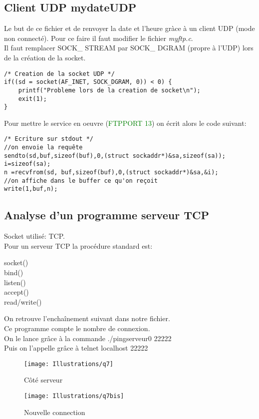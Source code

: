 \documentclass[paper=a4, fontsize=12pt]{article}
\numberwithin{equation}{section}		%
\numberwithin{figure}{section}			%
\numberwithin{table}{section}				%
\begin{document}
\subsection{Client UDP mydateUDP}
Le but de ce fichier et de renvoyer la date et l'heure gràce à un client UDP (mode non connecté). Pour ce faire il faut modifier le fichier \textit{myftp.c}.
\\
Il faut remplacer SOCK\_ STREAM par SOCK\_ DGRAM (propre à l'UDP) lors de la création de la socket.
\begin{verbatim}
/* Creation de la socket UDP */
if((sd = socket(AF_INET, SOCK_DGRAM, 0)) < 0) {
	printf("Probleme lors de la creation de socket\n");
	exit(1);
}
\end{verbatim}
Pour mettre le service en oeuvre (\textcolor{green}{FTPPORT 13}) on écrit alors le code suivant:

\begin{verbatim}
/* Ecriture sur stdout */
//on envoie la requête
sendto(sd,buf,sizeof(buf),0,(struct sockaddr*)&sa,sizeof(sa));
i=sizeof(sa);
n =recvfrom(sd, buf,sizeof(buf),0,(struct sockaddr*)&sa,&i);
//on affiche dans le buffer ce qu'on reçoit
write(1,buf,n);
\end{verbatim}

\subsection{Analyse d'un programme serveur TCP}
Socket utilisé: TCP.\\

Pour un serveur TCP la procédure standard est:
\begin{center}
socket()\\
bind()\\
listen()\\
accept()\\
read/write()\\
\end{center}
On retrouve l'enchaînement suivant dans notre fichier.
\\Ce programme compte le nombre de connexion.\\
On le lance grâce à la commande ./pingserveur0 22222\\
Puis on l'appelle grâce à telnet localhost 22222
\begin{figure}[h!]
\centerline{\texttt{[image: Illustrations/q7]}}
\caption{\label{Illustrations/q7} Côté serveur}
\end{figure}
\begin{figure}[h!]
\centerline{\texttt{[image: Illustrations/q7bis]}}
\caption{\label{Illustrations/q7bis} Nouvelle connection}
\end{figure}
\end{document}
